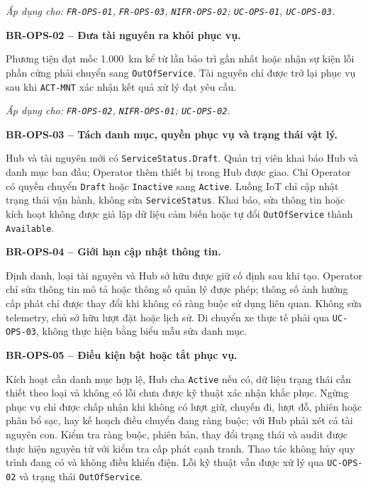 \textit{Áp dụng cho: \texttt{FR-OPS-01}, \texttt{FR-OPS-03}, \texttt{NIFR-OPS-02}; \texttt{UC-OPS-01}, \texttt{UC-OPS-03}.}

\medskip
\noindent\textbf{BR-OPS-02 -- Đưa tài nguyên ra khỏi phục vụ.}\par
\nopagebreak[4]
Phương tiện đạt mốc 1.000~km kể từ lần bảo trì gần nhất hoặc nhận sự kiện lỗi phần cứng phải chuyển sang \texttt{OutOfService}. Tài nguyên chỉ được trở lại phục vụ sau khi \texttt{ACT-MNT} xác nhận kết quả xử lý đạt yêu cầu.

\textit{Áp dụng cho: \texttt{FR-OPS-02}, \texttt{NIFR-OPS-01}; \texttt{UC-OPS-02}.}

\medskip
\noindent\textbf{BR-OPS-03 -- Tách danh mục, quyền phục vụ và trạng thái vật lý.}\par
\nopagebreak[4]
Hub và tài nguyên mới có \texttt{ServiceStatus.Draft}. Quản trị viên khai báo Hub và danh mục ban đầu; Operator thêm thiết bị trong Hub được giao. Chỉ Operator có quyền chuyển \texttt{Draft} hoặc \texttt{Inactive} sang \texttt{Active}. Luồng IoT chỉ cập nhật trạng thái vận hành, không sửa \texttt{ServiceStatus}. Khai báo, sửa thông tin hoặc kích hoạt không được giả lập dữ liệu cảm biến hoặc tự đổi \texttt{OutOfService} thành \texttt{Available}.

\medskip
\noindent\textbf{BR-OPS-04 -- Giới hạn cập nhật thông tin.}\par
\nopagebreak[4]
Định danh, loại tài nguyên và Hub sở hữu được giữ cố định sau khi tạo. Operator chỉ sửa thông tin mô tả hoặc thông số quản lý được phép; thông số ảnh hưởng cấp phát chỉ được thay đổi khi không có ràng buộc sử dụng liên quan. Không sửa telemetry, chủ sở hữu lượt đặt hoặc lịch sử. Di chuyển xe thực tế phải qua \texttt{UC-OPS-03}, không thực hiện bằng biểu mẫu sửa danh mục.

\medskip
\noindent\textbf{BR-OPS-05 -- Điều kiện bật hoặc tắt phục vụ.}\par
\nopagebreak[4]
Kích hoạt cần danh mục hợp lệ, Hub cha \texttt{Active} nếu có, dữ liệu trạng thái cần thiết theo loại và không có lỗi chưa được kỹ thuật xác nhận khắc phục. Ngừng phục vụ chỉ được chấp nhận khi không có lượt giữ, chuyến đi, lượt đỗ, phiên hoặc phân bổ sạc, hay kế hoạch điều chuyển đang ràng buộc; với Hub phải xét cả tài nguyên con. Kiểm tra ràng buộc, phiên bản, thay đổi trạng thái và audit được thực hiện nguyên tử với kiểm tra cấp phát cạnh tranh. Thao tác không hủy quy trình đang có và không điều khiển điện. Lỗi kỹ thuật vẫn được xử lý qua \texttt{UC-OPS-02} và trạng thái \texttt{OutOfService}.

